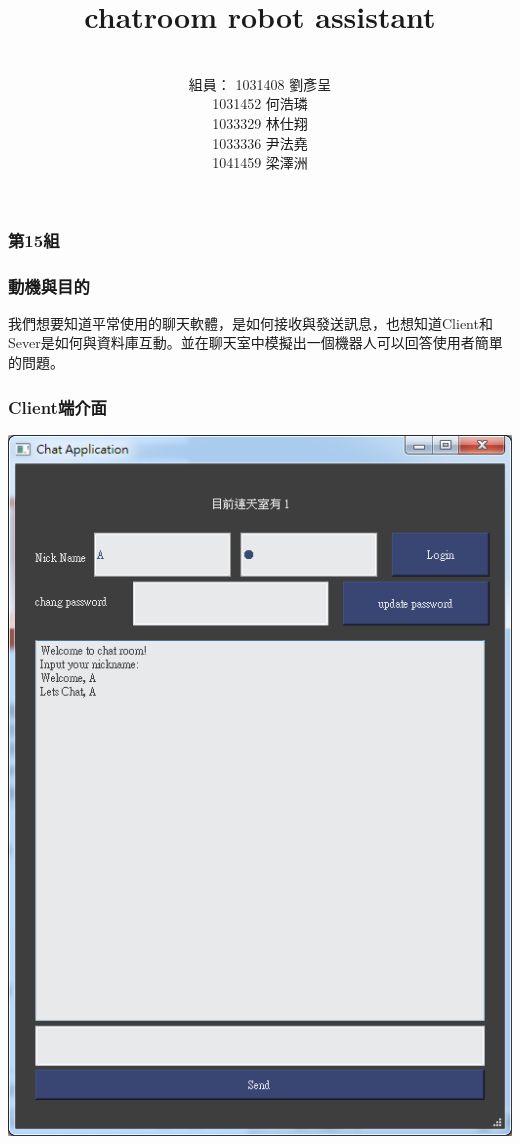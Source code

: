 \documentclass[utf8x]{beamer}
\title[Short title]{\Huge chatroom robot assistant} %
\author{\\  \hspace{-3em}組員： 1031408 劉彥呈 \\ 1031452 何浩璘 \\ 1033329 林仕翔 \\ 1033336 尹法堯 \\ 1041459 梁澤洲} %
\date{} %
\begin{document}
\begin{frame}
\frametitle{\huge 第15組} %
\titlepage %
\end{frame}
\begin{frame}[t]
\frametitle{\huge  動機與目的} %
\vspace{2em}
\hspace{1em} \Large 我們想要知道平常使用的聊天軟體，是如何接收與發送訊息，也想知道Client和Sever是如何與資料庫互動。並在聊天室中模擬出一個機器人可以回答使用者簡單的問題。
\end{frame}
\begin{frame}
\frametitle{\huge Client端介面} %
\hspace{2.9cm} \includegraphics[scale=0.28]{clientui}
\end{frame}
\end{document}
